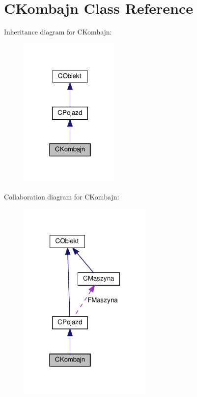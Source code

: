 \hypertarget{class_c_kombajn}{}\section{C\+Kombajn Class Reference}
\label{class_c_kombajn}


Inheritance diagram for C\+Kombajn\+:\nopagebreak
\begin{figure}[H]
\begin{center}
\leavevmode
\includegraphics[width=142pt]{class_c_kombajn__inherit__graph}
\end{center}
\end{figure}


Collaboration diagram for C\+Kombajn\+:\nopagebreak
\begin{figure}[H]
\begin{center}
\leavevmode
\includegraphics[width=187pt]{class_c_kombajn__coll__graph}
\end{center}
\end{figure}
